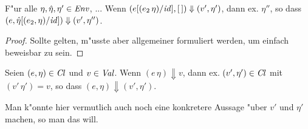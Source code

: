 \documentclass[12pt,fleqn]{article}
\newcommand{\Cl}{\name{Cl}}
\begin{document}
\begin{lemma}[Koinzidenz] \label{lemma:Koinzidenz}
  F"ur alle $\eta,\hat{\eta},\eta'\in{\text{\it Env\/}}$, ...
  Wenn $(e[(e_2\,\eta)/{\text{\it id\/}}],[\,]) \Downarrow (v',\eta')$, dann ex. $\eta''$, so dass
  $(e,\hat{\eta}[(e_2,\eta)/{\text{\it id\/}}]) \Downarrow (v',\eta'')$.
\end{lemma}

\begin{proof}
  Sollte gelten, m"usste aber allgemeiner formuliert werden, um einfach beweisbar zu sein.
\end{proof}

\begin{theorem} \label{theorem:Vollstaendigkeit}
  Seien $(e,\eta)\in\Cl$ und $v \in {\text{\it Val\/}}$.
  Wenn $(e\,\eta) \Downarrow v$, dann ex. $(v',\eta')\in\Cl$ mit $(v'\,\eta') = v$, so dass
  $(e,\eta) \Downarrow (v',\eta')$.
\end{theorem}

Man k"onnte hier vermutlich auch noch eine konkretere Aussage "uber $v'$ und $\eta'$ machen, so man das will.
\end{document}
